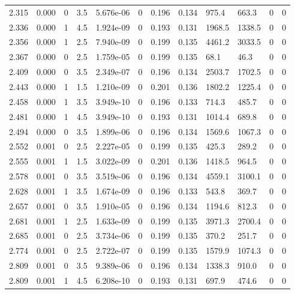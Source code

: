 \documentclass[preview]{standalone}
\begin{document}
{{{\begin{tabular}{L{1.2cm}C{1.2cm} C{0.3cm}C{0.5cm} C{1.4cm}C{1.4cm} C{1.4cm}C{1.4cm} C{1.6cm}C{1.6cm} C{1.6cm}C{1.6cm}}
  2.315  &  0.000  & 0     & 3.5 &  5.676e-06  & 0  &  0.196&   0.134& 975.4 & 663.3   &  0 & 0  \\ 
  2.336  &  0.000  & 1     & 4.5 &  1.924e-09  & 0  &  0.193&   0.131& 1968.5 & 1338.5   &  0 & 0  \\ 
  2.356  &  0.000  & 1     & 2.5 &  7.940e-09  & 0  &  0.199&   0.135& 4461.2 & 3033.5   &  0 & 0  \\ 
  2.367  &  0.000  & 0     & 2.5 &  1.759e-05  & 0  &  0.199&   0.135& 68.1 & 46.3   &  0 & 0  \\ 
  2.409  &  0.000  & 0     & 3.5 &  2.349e-07  & 0  &  0.196&   0.134& 2503.7 & 1702.5   &  0 & 0  \\ 
  2.443  &  0.000  & 1     & 1.5 &  1.210e-09  & 0  &  0.201&   0.136& 1802.2 & 1225.4   &  0 & 0  \\ 
  2.458  &  0.000  & 1     & 3.5 &  3.949e-10  & 0  &  0.196&   0.133& 714.3 & 485.7   &  0 & 0  \\ 
  2.481  &  0.000  & 1     & 4.5 &  3.949e-10  & 0  &  0.193&   0.131& 1014.4 & 689.8   &  0 & 0  \\ 
  2.494  &  0.000  & 0     & 3.5 &  1.899e-06  & 0  &  0.196&   0.134& 1569.6 & 1067.3   &  0 & 0  \\ 
  2.552  &  0.001  & 0     & 2.5 &  2.227e-05  & 0  &  0.199&   0.135& 425.3 & 289.2   &  0 & 0  \\ 
  2.555  &  0.001  & 1     & 1.5 &  3.022e-09  & 0  &  0.201&   0.136& 1418.5 & 964.5   &  0 & 0  \\ 
  2.578  &  0.001  & 0     & 3.5 &  3.519e-06  & 0  &  0.196&   0.134& 4559.1 & 3100.1   &  0 & 0  \\ 
  2.628  &  0.001  & 1     & 3.5 &  1.674e-09  & 0  &  0.196&   0.133& 543.8 & 369.7   &  0 & 0  \\ 
  2.657  &  0.001  & 0     & 3.5 &  1.910e-05  & 0  &  0.196&   0.134& 1194.6 & 812.3   &  0 & 0  \\ 
  2.681  &  0.001  & 1     & 2.5 &  1.633e-09  & 0  &  0.199&   0.135& 3971.3 & 2700.4   &  0 & 0  \\ 
  2.685  &  0.001  & 0     & 2.5 &  3.734e-06  & 0  &  0.199&   0.135& 370.2 & 251.7   &  0 & 0  \\ 
  2.774  &  0.001  & 0     & 2.5 &  2.722e-07  & 0  &  0.199&   0.135& 1579.9 & 1074.3   &  0 & 0  \\ 
  2.809  &  0.001  & 0     & 3.5 &  9.389e-06  & 0  &  0.196&   0.134& 1338.3 & 910.0   &  0 & 0  \\ 
  2.809  &  0.001  & 1     & 4.5 &  6.208e-10  & 0  &  0.193&   0.131& 697.9 & 474.6   &  0 & 0  \\ 

\end{tabular}}}}
\end{document}
